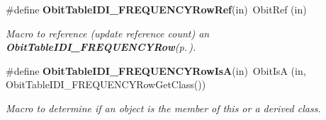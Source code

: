 \begin{CompactItemize}
\#define {\bf Obit\-Table\-IDI\_\-FREQUENCYRow\-Ref}(in)\ Obit\-Ref (in)
\begin{CompactList}\small\item\em Macro to reference (update reference count) an {\bf Obit\-Table\-IDI\_\-FREQUENCYRow}{\rm (p.\,\pageref{structObitTableIDI__FREQUENCYRow})}. \item\end{CompactList}\item 
\#define {\bf Obit\-Table\-IDI\_\-FREQUENCYRow\-Is\-A}(in)\ Obit\-Is\-A (in, Obit\-Table\-IDI\_\-FREQUENCYRow\-Get\-Class())
\begin{CompactList}\small\item\em Macro to determine if an object is the member of this or a derived class. \item\end{CompactList}\end{CompactItemize}
